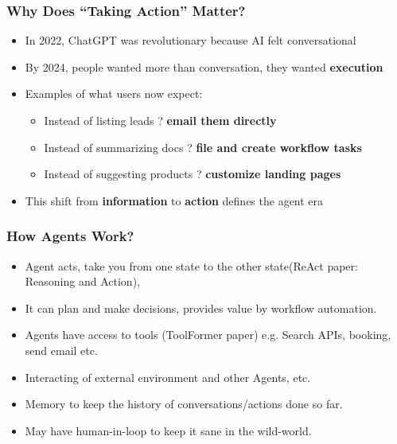 \begin{frame}[fragile]\frametitle{Why Does ``Taking Action'' Matter?}
\begin{itemize}
    \item In 2022, ChatGPT was revolutionary because AI felt conversational
    \item By 2024, people wanted more than conversation, they wanted \textbf{execution}
    \item Examples of what users now expect:
    \begin{itemize}
        \item Instead of listing leads ? \textbf{email them directly}
        \item Instead of summarizing docs ? \textbf{file and create workflow tasks}
        \item Instead of suggesting products ? \textbf{customize landing pages}
    \end{itemize}
    \item This shift from \textbf{information} to \textbf{action} defines the agent era
\end{itemize}
\end{frame}


\begin{frame}[fragile]\frametitle{How Agents Work?}
    \begin{itemize}
        \item Agent acts, take you from one state to the other state(ReAct paper: Reasoning and Action), 
		\item It can plan and make decisions, provides value by workflow automation. 
		\item Agents have access to tools (ToolFormer paper) e.g. Search APIs, booking, send email etc.
		\item Interacting of external environment and other Agents, etc.
		\item Memory to keep the history of conversations/actions done so far.
		\item May have human-in-loop to keep it sane in the wild-world.
    \end{itemize}
\end{frame}

